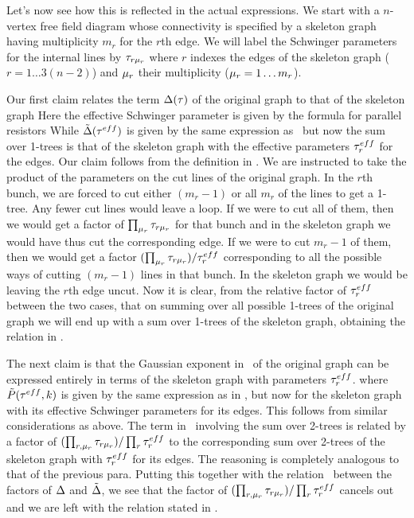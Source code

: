 Let's now see how this is reflected in the actual expressions. We
start with a $n$-vertex free field diagram whose connectivity is
specified by a skeleton graph having multiplicity $m_r$ for the
$r$th edge. We will label the Schwinger parameters
for the internal lines by ${\tau}_{r {\mu}_r}$ where $r$ indexes the
edges of the skeleton graph ($r=1\ldots 3(n-2)$) and ${\mu}_r$ their
multiplicity (${\mu}_r=1\ldots m_r$).

Our first claim relates the term ${\Delta}({\tau})$ of the original graph to
that of the skeleton graph
%
\eqn{}
%
Here the effective Schwinger parameter is given by the formula for
parallel resistors
%
\eqn{}
%
While $\tilde{{\Delta}}({\tau}^{eff})$ is given by the same expression as
\meas\ but now the sum over 1-trees is that of the skeleton graph
with the effective parameters ${\tau}^{eff}_r$ for the edges. Our
claim follows from the definition in \meas . We are instructed to
take the product of the parameters on the cut lines of the
original graph. In the $r$th bunch, we are forced to cut either
$(m_r-1)$ or all $m_r$ of the lines to get a 1-tree. Any fewer cut
lines would leave a loop. If we were to cut all of them, then we
would get a factor of $\prod_{{\mu}_r}{\tau}_{r {\mu}_r}$ for that bunch and
in the skeleton graph we would have thus cut the corresponding
edge. If we were to cut $m_r-1$ of them, then we would get a
factor $(\prod_{{\mu}_r}{\tau}_{r {\mu}_r})/{\tau}^{eff}_r$ corresponding to all
the possible ways of cutting $(m_r-1)$ lines in that bunch. In the
skeleton graph we would be leaving the $r$th edge uncut. Now it is
clear, from the relative factor of ${\tau}^{eff}_r$ between the two
cases, that on summing over all possible 1-trees of the original
graph we will end up with a sum over 1-trees of the skeleton
graph, obtaining the relation in \effmeas .

The next claim is that the Gaussian exponent in \gauss\ of the
original graph can be expressed entirely in terms of the skeleton
graph with parameters ${\tau}^{eff}_r$. 
\eqn{} 
where $\tilde{P}({\tau}^{eff}, k)$ is
given by the same expression as in \gauss , but now for the
skeleton graph with its effective Schwinger parameters for its
edges. This follows from similar considerations as above. The term
in \gauss\ involving the sum over 2-trees is related by a factor
of $(\prod_{r,{\mu}_r}{\tau}_{r {\mu}_r})/\prod_{r}{\tau}^{eff}_r$ to the
corresponding sum over 2-trees of the skeleton graph with
${\tau}^{eff}_r$ for its edges. The reasoning is completely analogous
to that of the previous para. Putting this together with the
relation \effmeas\ between the factors of ${\Delta}$ and $\tilde{{\Delta}}$,
we see that the factor of $(\prod_{r,{\mu}_r}{\tau}_{r
{\mu}_r})/\prod_{r}{\tau}^{eff}_r$ cancels out and we are left with the
relation stated in \effgauss .

